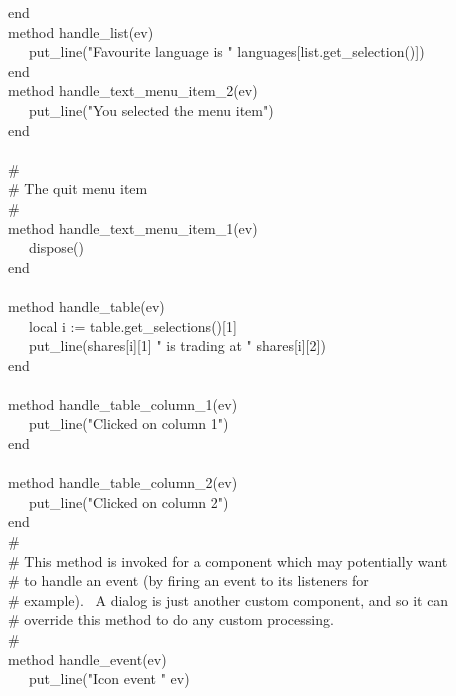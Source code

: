{\>   end \\
\>   method handle\_list(ev) \\
\>   \ \ \ put\_line("Favourite language is
" {\textbar}{\textbar} languages[list.get\_selection()]) \\
\>   end \\
\>   method handle\_text\_menu\_item\_2(ev) \\
\>   \ \ \ put\_line("You selected the menu
item") \\
\>   end \\
\ \\
\>   \# \\
\>   \# The quit menu item \\
\>   \# \\
\>   method handle\_text\_menu\_item\_1(ev) \\
\>   \ \ \ dispose() \\
\>   end \\
\ \\
\>   method handle\_table(ev) \\
\>   \ \ \ local i := table.get\_selections()[1] \\
\>   \ \ \ put\_line(shares[i][1] {\textbar}{\textbar} "
is trading at " {\textbar}{\textbar} shares[i][2]) \\
\>   end \\
\ \\
\>   method handle\_table\_column\_1(ev) \\
\>   \ \ \ put\_line("Clicked on column
1") \\
\>   end \\
\ \\
\>   method handle\_table\_column\_2(ev) \\
\>   \ \ \ put\_line("Clicked on column
2") \\
\>   end
\ \\
\>   \# \\
\>   \# This method is invoked for a component which may potentially want \\
\>   \# to handle an event (by firing an event to its listeners for\\
\>   \# example). \ A dialog is just another custom component, and so it can\\
\>   \# override this method to do any custom processing. \\
\>   \# \\
\>   method handle\_event(ev) \\
\>   \ \ \ put\_line("Icon event "
{\textbar}{\textbar} ev) \\
}
